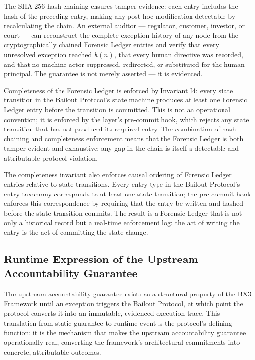 The SHA-256 hash chaining ensures tamper-evidence: each entry includes the
hash of the preceding entry, making any post-hoc modification detectable by
recalculating the chain.  An external auditor --- regulator, customer,
investor, or court --- can reconstruct the complete exception history of any
node from the cryptographically chained Forensic Ledger entries and verify
that every unresolved exception reached $h(n)$, that every human directive
was recorded, and that no machine actor suppressed, redirected, or substituted
for the human principal.  The guarantee is not merely asserted --- it is
evidenced.

Completeness of the Forensic Ledger is enforced by Invariant I4: every state
transition in the Bailout Protocol's state machine produces at least one
Forensic Ledger entry before the transition is committed.  This is not an
operational convention; it is enforced by the \fact{} layer's pre-commit
hook, which rejects any state transition that has not produced its required
entry.  The combination of hash chaining and completeness enforcement means
that the Forensic Ledger is both tamper-evident and exhaustive: any gap in
the chain is itself a detectable and attributable protocol violation.

The completeness invariant also enforces causal ordering of Forensic Ledger
entries relative to state transitions.  Every entry type in the Bailout
Protocol's entry taxonomy corresponds to at least one state transition; the
pre-commit hook enforces this correspondence by requiring that the entry be
written and hashed before the state transition commits.  The result is a
Forensic Ledger that is not only a historical record but a real-time
enforcement log: the act of writing the entry is the act of committing the
state change.

\subsection{Runtime Expression of the Upstream Accountability Guarantee}
\label{sec:bailout-uag}

The upstream accountability guarantee exists as a structural property of the
BX3 Framework until an exception triggers the Bailout Protocol, at which
point the protocol converts it into an immutable, evidenced execution trace.
This translation from static guarantee to runtime event is the protocol's
defining function: it is the mechanism that makes the upstream accountability
guarantee operationally real, converting the framework's architectural
commitments into concrete, attributable outcomes.

